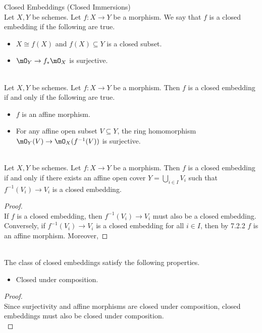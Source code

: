 \documentclass[a4paper]{article}
\begin{document}
\begin{defn}{Closed Embeddings (Closed Immersions)}{}\\
Let $X,Y$ be schemes. Let $f:X\to Y$ be a morphism. We say that $f$ is a closed embedding if the following are true. 
\begin{itemize}
\item $X\cong f(X)$ and $f(X)\subseteq Y$ is a closed subset. 
\item $\mO_Y\to f_\ast\mO_X$ is surjective. 
\end{itemize}
\end{defn}

\begin{prp}{}{}\\
Let $X,Y$ be schemes. Let $f:X\to Y$ be a morphism. Then $f$ is a closed embedding if and only if the following are true. 
\begin{itemize}
\item $f$ is an affine morphism. 
\item For any affine open subset $V\subseteq Y$, the ring homomorphism $\mO_Y(V)\to\mO_X(f^{-1}(V))$ is surjective. 
\end{itemize}
\end{prp}

\begin{lmm}{}{}\\
Let $X,Y$ be schemes. Let $f:X\to Y$ be a morphism. Then $f$ is a closed embedding if and only if there exists an affine open cover $Y=\bigcup_{i\in I}V_i$ such that $f^{-1}(V_i)\to V_i$ is a closed embedding. 
\begin{proof}\\
If $f$ is a closed embedding, then $f^{-1}(V_i)\to V_i$ must also be a closed embedding. Conversely, if $f^{-1}(V_i)\to V_i$ is a closed embedding for all $i\in I$, then by 7.2.2 $f$ is an affine morphism. Moreover, 
\end{proof}
\end{lmm}

\begin{lmm}{}{}\\
The class of closed embeddings satisfy the following properties. 
\begin{itemize}
\item Closed under composition. 
\end{itemize}
\begin{proof}\\
Since surjectivity and affine morphisms are closed under composition, closed embeddings must also be closed under composition. \\
\end{proof}
\end{lmm}
\end{document}
